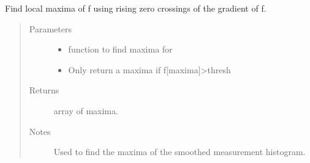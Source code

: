 \documentclass[letterpaper,10pt,english]{sphinxmanual}
\begin{document}
\begin{fulllineitems}
\label{\detokenize{tes:tes.analysis.maxima}}
\sphinxAtStartPar
Find local maxima of f using rising zero crossings of the gradient of f.
\begin{quote}\begin{description}
\item[{Parameters}] \leavevmode\begin{itemize}
\item {} 
\sphinxAtStartPar
{} \textendash{} function to find maxima for

\item {} 
\sphinxAtStartPar
{} \textendash{} Only return a maxima if f{[}maxima{]}\textgreater{}thresh

\end{itemize}

\item[{Returns}] \leavevmode
\sphinxAtStartPar
array of maxima.

\item[{Notes}] \leavevmode
\sphinxAtStartPar
Used to find the maxima of the smoothed measurement histogram.

\end{description}\end{quote}

\end{fulllineitems}

\end{document}

